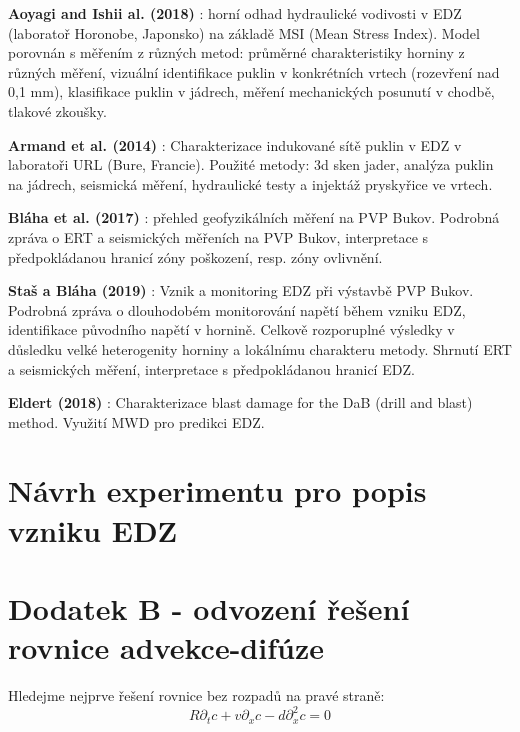 \documentclass{article}
\def\prtl{\partial}
\begin{document}
{\bf Aoyagi and Ishii al. (2018)} \cite{Aoyagi2018}: horní odhad hydraulické vodivosti v EDZ (laboratoř Horonobe, Japonsko) na základě MSI (Mean Stress Index). Model porovnán s měřením z různých metod: průměrné charakteristiky horniny z různých měření, vizuální identifikace puklin v konkrétních vrtech (rozevření nad 0,1 mm), klasifikace puklin v jádrech, měření mechanických posunutí v chodbě, tlakové zkoušky.

{\bf Armand et al. (2014)} \cite{Armand2014}: Charakterizace indukované sítě puklin v EDZ v laboratoři URL (Bure, Francie). Použité metody: 3d sken jader, analýza puklin na jádrech, seismická měření, hydraulické testy a injektáž pryskyřice ve vrtech. 

{\bf Bláha et al. (2017)} \cite{SURAO_184/2014}: přehled geofyzikálních měření na PVP Bukov.
Podrobná zpráva o ERT a seismických měřeních na PVP Bukov, interpretace s předpokládanou hranicí zóny poškození, resp. zóny ovlivnění.  

{\bf Staš a Bláha (2019)} \cite{SURAO_351/2019}: Vznik a monitoring EDZ při výstavbě PVP Bukov.
Podrobná zpráva o dlouhodobém monitorování napětí během vzniku EDZ, identifikace původního napětí v hornině. Celkově rozporuplné výsledky v důsledku velké heterogenity horniny a lokálnímu charakteru metody. Shrnutí ERT a seismických měření, interpretace s předpokládanou hranicí EDZ.  

{\bf Eldert (2018)} \cite{JeroenvanEldert2018}: Charakterizace blast damage for the DaB (drill and blast) method. Využití MWD pro predikci EDZ.

\section{Návrh experimentu pro popis vzniku EDZ}

\label{sec:experiment}



\pagebreak






\section*{Dodatek B - odvození řešení rovnice advekce-difúze}
Hledejme nejprve řešení rovnice bez rozpadů na pravé straně:
\begin{equation}
    \label{eq:no_decay_ad}
    R\prtl_t c + v \prtl_x c - d \prtl^2_x c = 0
\end{equation}
\end{document}
